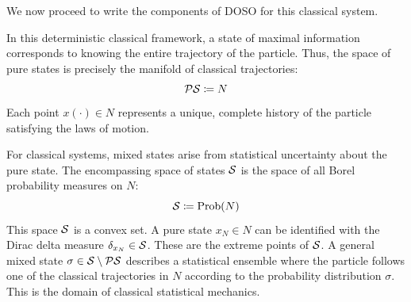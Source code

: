We now proceed to write the components of DOSO for this classical system.

In this deterministic classical framework, a state of maximal information corresponds to knowing the entire trajectory of the particle. Thus, the space of pure states is precisely the manifold of classical trajectories:
\[ \mathcal{PS} \coloneqq N \]
Each point $x(\cdot) \in N$ represents a unique, complete history of the particle satisfying the laws of motion.

For classical systems, mixed states arise from statistical uncertainty about the pure state. The encompassing space of states $\mathcal{S}$ is the space of all Borel probability measures on $N$:
\[ \mathcal{S} \coloneqq \text{Prob}(N) \]
This space $\mathcal{S}$ is a convex set. A pure state $x_N \in N$ can be identified with the Dirac delta measure $\delta_{x_N} \in \mathcal{S}$. These are the extreme points of $\mathcal{S}$.
A general mixed state $\sigma \in \mathcal{S} \setminus \mathcal{PS}$ describes a statistical ensemble where the particle follows one of the classical trajectories in $N$ according to the probability distribution $\sigma$. This is the domain of classical statistical mechanics.

